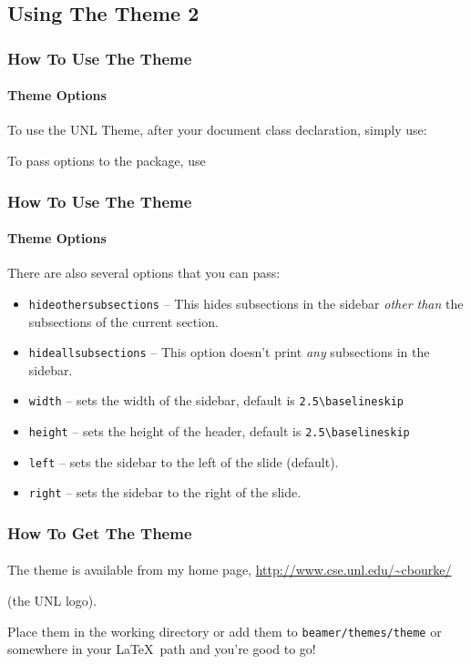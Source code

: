 \documentclass{beamer}
\begin{document}
\subsection{Using The Theme 2 }

\begin{frame}[fragile]
    \frametitle{How To Use The Theme}
    \framesubtitle{Theme Options}
    
    To use the UNL Theme, after your document class declaration, simply use:
    
    
    To pass options to the package, use
    
    
\end{frame}
\begin{frame}[fragile]
    \frametitle{How To Use The Theme}
    \framesubtitle{Theme Options}
        
    There are also several options that you can pass:
    \begin{itemize}
      \item \texttt{hideothersubsections} -- This hides subsections in the 
            sidebar \emph{other than} the subsections of the current section.
      \item \texttt{hideallsubsections} -- This option doesn't print \emph{any}
            subsections in the sidebar.
      \item \texttt{width} -- sets the width of the sidebar, default is 
      	    \verb"2.5\baselineskip"
      \item \texttt{height} -- sets the height of the header, default is 
      	    \verb"2.5\baselineskip"
      \item \texttt{left} -- sets the sidebar to the left of the slide (default).
      \item \texttt{right} -- sets the sidebar to the right of the slide.
    \end{itemize}
    
\end{frame}

\begin{frame}
    \frametitle{How To Get The Theme}
    \framesubtitle{}
    
    The theme is available from my home page,
    \textcolor{blue}{\url{http://www.cse.unl.edu/~cbourke/}}
    

    (the UNL logo).
    
    Place them in the working directory or add them to \texttt{beamer/themes/theme}
    or somewhere in your \LaTeX\ path and you're good to go!
    
\end{frame}
    
\end{document}
